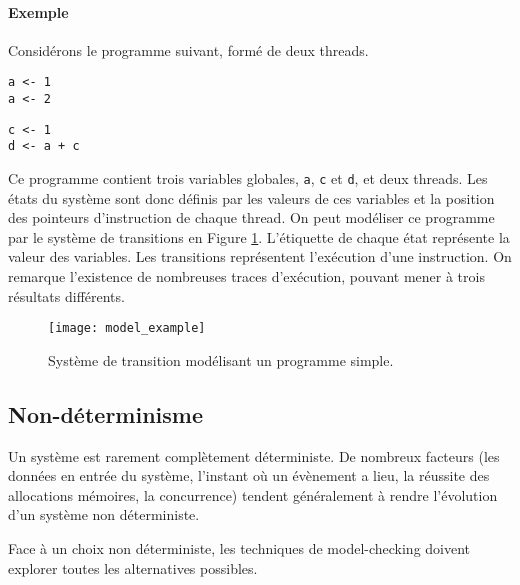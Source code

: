 \paragraph{Exemple}

Considérons le programme suivant, formé de deux threads.

\noindent\begin{minipage}{.45\textwidth}
\begin{lstlisting}[caption=Thread 1, frame=single]
a <- 1
a <- 2
\end{lstlisting}
\end{minipage}\hfill
\begin{minipage}{.45\textwidth}
\begin{lstlisting}[caption=Thread 2,frame=tlrb]
c <- 1
d <- a + c
\end{lstlisting}
\end{minipage}

Ce programme contient trois variables globales, \texttt{a}, \texttt{c} et
\texttt{d}, et deux threads. Les états du système sont donc définis par les
valeurs de ces variables et la position des pointeurs d'instruction de chaque
thread. On peut modéliser ce programme par le système de transitions en Figure
\ref{fig:model_example}. L'étiquette de chaque état représente la valeur des
variables. Les transitions représentent l'exécution d'une instruction. On
remarque l'existence de nombreuses traces d'exécution, pouvant mener à trois
résultats différents.

\begin{figure}
\begin{center}
\texttt{[image: model\_example]}
\end{center}
\caption{Système de transition modélisant un programme simple.}
\label{fig:model_example}
\end{figure}

\subsection{Non-déterminisme}

Un système est rarement complètement déterministe. De nombreux facteurs (les
données en entrée du système, l'instant où un évènement a lieu, la réussite des
allocations mémoires, la concurrence) tendent généralement à rendre l'évolution
d'un système non déterministe.

Face à un choix non déterministe, les techniques de model-checking doivent
explorer toutes les alternatives possibles.

